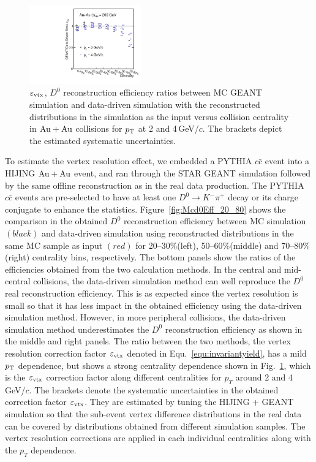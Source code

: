 \documentclass[%
 reprint,	
 amsmath,amssymb,
 aps,
 prc,
]{revtex4-1}
\begin{document}
\begin{figure}
\centering
\includegraphics[width=0.43\textwidth]{fig/Mcd0Eff_20_80_vsCent.pdf}
\caption{$\varepsilon_{\rm vtx}$, $D^0$ reconstruction efficiency ratios between MC GEANT simulation and data-driven simulation with the reconstructed distributions in the simulation as the input versus collision centrality in ${\rm{Au + Au}}$ collisions for $p_{\rm T}$ at 2 and 4\,GeV/$c$. The brackets depict the estimated systematic uncertainties.}
\label{fig:Mcd0Eff_20_80_vsCent} 
\end{figure}

To estimate the vertex resolution effect, we embedded a PYTHIA $c\bar{c}$ event into a HIJING ${\rm{Au + Au}}$ event, and ran through the STAR GEANT simulation followed by the same offline reconstruction as in the real data production. The PYTHIA $c\bar{c}$ events are pre-selected to have at least one $D^0\rightarrow K^-\pi^+$ decay or its charge conjugate to enhance the statistics. Figure~\ref{fig:Mcd0Eff_20_80} shows the comparison in the obtained $D^0$ reconstruction efficiency between MC simulation $(black)$ and data-driven simulation using reconstructed distributions in the same MC sample as input $(red)$ for 20--30\%(left), 50--60\%(middle) and 70--80\%(right) centrality bins, respectively. The bottom panels show the ratios of the efficiencies obtained from the two calculation methods. In the central and mid-central collisions, the data-driven simulation method can well reproduce the $D^0$ real reconstruction efficiency. This is as expected since the vertex resolution is small so that it has less impact in the obtained efficiency using the data-driven simulation method. However, in more peripheral collisions, the data-driven simulation method underestimates the $D^0$ reconstruction efficiency as shown in the middle and right panels. The ratio between the two methods, the vertex resolution correction factor $\varepsilon_{\rm vtx}$ denoted in Equ.~\ref{equ:invariantyield}, has a mild $p_{\rm T}$ dependence, but shows a strong centrality dependence shown in Fig.~\ref{fig:Mcd0Eff_20_80_vsCent}, which is the $\varepsilon_{\rm vtx}$ correction factor along different centralities for $p_T$ around 2 and 4 GeV/$c$. The brackets denote the systematic uncertainties in the obtained correction factor $\varepsilon_{\rm vtx}$. They are estimated by tuning the HIJING + GEANT simulation so that the sub-event vertex difference distributions in the real data can be covered by distributions obtained from different simulation samples. The vertex resolution corrections are applied in each individual centralities along with the $p_T$ dependence.
\end{document}
